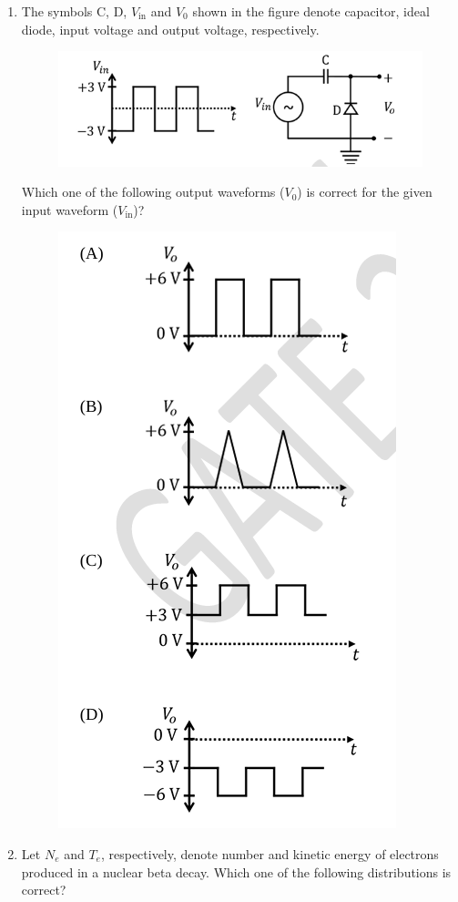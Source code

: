 \documentclass[journal,12pt,onecolumn]{IEEEtran}
\theoremstyle{remark}
\begin{document}
\begin{enumerate}
\item The symbols C, D, $V_\text{in}$ and $V_0$ shown in the figure denote capacitor, ideal diode, input voltage and output voltage, respectively.
\begin{figure}[H]
    \centering
    \includegraphics[width = 0.7\columnwidth]{fig/Q18(1).png}
    \caption*{}
    \label{fig:Q18(1)}
\end{figure}
Which one of the following output waveforms ($V_0$) is correct for the given input waveform ($V_\text{in}$)?
\begin{figure}[H]
    \centering
    \includegraphics[width = 0.6\columnwidth]{fig/Q18(2).png}
    \caption*{}
    \label{fig: Q18(2)}
\end{figure}
\newpage
\item Let $N_e$ and $T_e$, respectively, denote number and kinetic energy of electrons produced in a nuclear beta decay. Which one of the following distributions is correct?
\begin{figure}[H]

\end{figure}
\end{enumerate}
\end{document}
